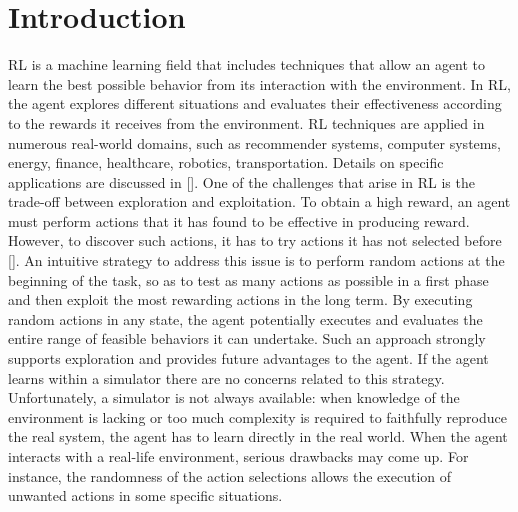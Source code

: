 \chapter{Introduction} \label{ch:intro}

\acf{RL} is a machine learning field that includes techniques that allow an agent to learn the best possible behavior from its interaction with the environment. In \ac{RL}, the agent explores different situations and evaluates their effectiveness according to the rewards it receives from the environment. \ac{RL} techniques are applied in numerous real-world domains, such as recommender systems, computer systems, energy, finance, healthcare, robotics, transportation. Details on specific applications are discussed in [\cite{yuxi2019}].
One of the challenges that arise in \ac{RL} is the trade-off between exploration and exploitation. To obtain a high reward, an agent must perform actions that it has found to be effective in producing reward. However, to discover such actions, it has to try actions it has not selected before [\cite{sutton2018reinforcement}]. An intuitive strategy to address this issue is to perform random actions at the beginning of the task, so as to test as many actions as possible in a first phase and then exploit the most rewarding actions in the long term. By executing random actions in any state, the agent potentially executes and evaluates the entire range of feasible behaviors it can undertake. Such an approach strongly supports exploration and provides future advantages to the agent. If the agent learns within a simulator there are no concerns related to this strategy. Unfortunately, a simulator is not always available: when knowledge of the environment is lacking or too much complexity is required to faithfully reproduce the real system, the agent has to learn directly in the real world. When the agent interacts with a real-life environment, serious drawbacks may come up. For instance, the randomness of the action selections allows the execution of unwanted actions in some specific situations.
